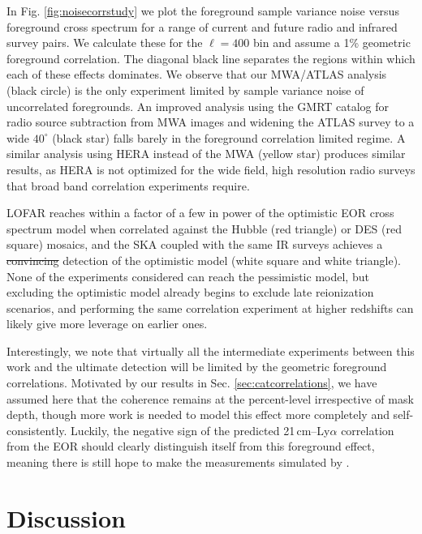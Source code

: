 \documentclass[numberedappendix]{emulateapj}
\providecommand{\DIFadd}[1]{{\protect\color{blue}\uwave{#1}}} %
\providecommand{\DIFdel}[1]{{\protect\color{red}\sout{#1}}}                      %
\providecommand{\DIFaddbegin}{} %
\providecommand{\DIFaddend}{} %
\providecommand{\DIFdelbegin}{} %
\providecommand{\DIFdelend}{} %
\begin{document}
In Fig. \ref{fig:noisecorrstudy} we plot the foreground sample variance noise versus foreground cross spectrum for a range of current and future radio and infrared survey pairs. We calculate these for the $\ell=400$ bin and assume a 1\% geometric foreground correlation. The diagonal black line separates the regions within which each of these effects dominates. We observe that our MWA/ATLAS analysis (black circle) is the only experiment limited by sample variance noise of uncorrelated foregrounds. An improved analysis using the GMRT catalog for radio source subtraction from MWA images and widening the ATLAS survey to a wide $40^\circ$ (black star) falls barely in the foreground correlation limited regime. A similar analysis using HERA instead of the MWA (yellow star) produces similar results, as HERA is not optimized for the wide field, high resolution radio surveys that broad band correlation experiments require. 

LOFAR reaches within a factor of a few in power of the optimistic EOR cross spectrum model when correlated against the Hubble (red triangle) or DES (red square) mosaics, and the SKA coupled with the same IR surveys achieves a \DIFdelbegin \DIFdel{convincing }\DIFdelend \DIFaddbegin \DIFadd{borderline }\DIFaddend detection of the optimistic model (white square and white triangle). None of the experiments considered can reach the pessimistic model, but excluding the optimistic model already begins to exclude late reionization scenarios, and performing the same correlation experiment at higher redshifts can likely give more leverage on earlier ones. 

Interestingly, we note that virtually all the intermediate experiments between this work and the ultimate detection will be limited by the geometric foreground correlations. Motivated by our results in Sec. \ref{sec:catcorrelations}, we have assumed here that the coherence remains at the percent-level irrespective of mask depth, though more work is needed to model this effect more completely and self-consistently. Luckily, the negative sign of the predicted 21\,cm--Ly$\alpha$ correlation from the EOR should clearly distinguish itself from this foreground effect, meaning there is still hope to make the measurements simulated by \citet{mao14,StarsAndReionization}.

\section{Discussion}
\end{document}
